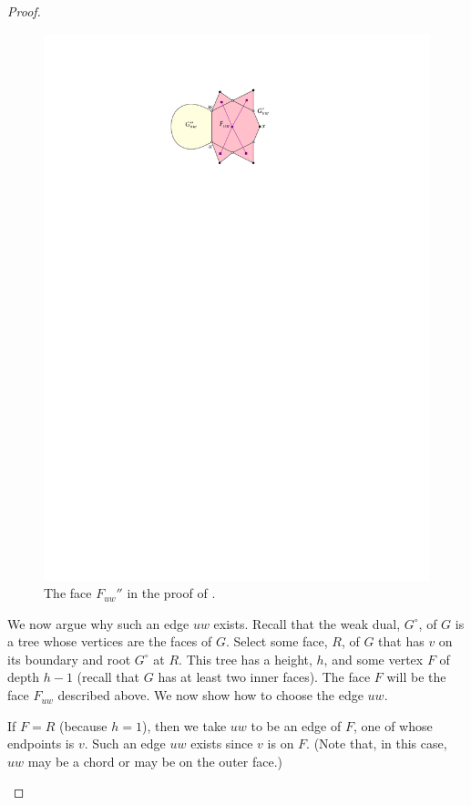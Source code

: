 \documentclass{patmorin}
\begin{document}
\begin{proof}
\begin{enumerate}
  \begin{figure}
    \begin{center}
       \includegraphics{figs/toughie}
    \end{center}
    \caption{The face $F_{uw}''$ in the proof of .}
  \end{figure}


  We now argue why such an edge $uw$ exists.  Recall that the weak dual,
  $G^{\circ}$, of $G$ is a tree whose vertices are the faces of $G$.
  Select some face, $R$, of $G$ that has $v$ on its boundary and root
  $G^\circ$ at $R$. This tree has a height, $h$, and some vertex $F$ of
  depth $h-1$ (recall that $G$ has at least two inner faces).  The face
  $F$ will be the face $F_{uw}$ described above.  We now show how to
  choose the edge $uw$.

  If $F=R$ (because $h=1$), then we take $uw$ to be an edge of $F$,
  one of whose endpoints is $v$.  Such an edge $uw$ exists since $v$
  is on $F$.  (Note that, in this case, $uw$ may be a chord or may be
  on the outer face.)


\end{enumerate}
\end{proof}
\end{document}
